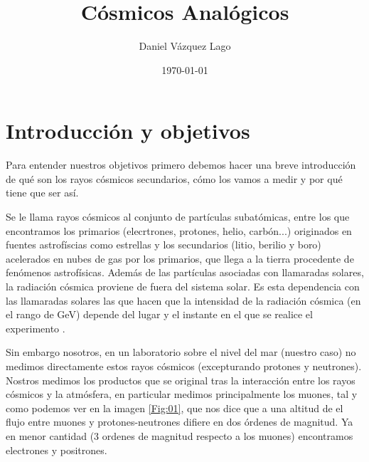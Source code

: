 \documentclass[11pt]{article}
\title{\textbf{\Huge Cósmicos Analógicos}}
\author{\Large Daniel Vázquez Lago}
\date{\today}
\begin{document}
\maketitle
\newpage
\tableofcontents
\newpage
\setlength{\parskip}{2.2mm} %


\section{Introducción y objetivos}

Para entender nuestros objetivos primero debemos hacer una breve introducción de qué son los rayos cósmicos secundarios, cómo los vamos a medir y por qué tiene que ser así.

\begin{minipage}{0.59\linewidth}

	\begingroup
	\setlength{\parskip}{2.2mm} %
	Se le llama rayos cósmicos al conjunto de partículas subatómicas, entre los que encontramos los primarios (elecrtrones, protones, helio, carbón...)  originados en fuentes astrofíscias como estrellas y los secundarios (litio, berilio y boro) acelerados en nubes de gas por los primarios, que llega a la tierra procedente de fenómenos astrofísicas. Además de las partículas asociadas con llamaradas solares, la radiación cósmica proviene de fuera del sistema solar. Es esta dependencia con las llamaradas solares las que hacen que la intensidad de la radiación cósmica (en el rango de GeV) depende del  lugar y el instante en el que se realice el experimento \cite{EIDELMAN20041}.

	Sin embargo nosotros, en un laboratorio sobre el nivel del mar (nuestro caso) no medimos directamente estos rayos cósmicos (excepturando protones y neutrones). Nostros medimos los productos que se original tras la interacción entre los rayos cósmicos y la atmósfera, en particular medimos principalmente los muones, tal y como podemos ver en la imagen \ref{Fig:01}, que nos dice que a una altitud de el flujo entre muones y protones-neutrones difiere en dos órdenes de magnitud.  Ya en menor cantidad (3 ordenes de magnitud respecto a los muones) encontramos electrones y positrones.
	\endgroup
\end{minipage}
\hfill
\end{document}
